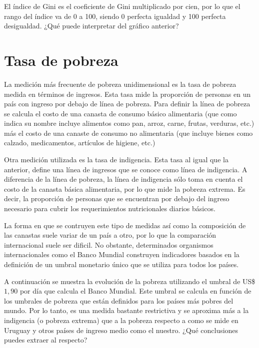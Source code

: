 \documentclass[11pt]{article}
\begin{document}
	\noindent El índice de Gini es el coeficiente de Gini multiplicado por cien, por lo que el rango del índice va de 0 a 100, siendo 0 perfecta igualdad y 100 perfecta desigualdad. ¿Qué puede interpretar del gráfico anterior? 
	
	\section{Tasa de pobreza}
	
	\noindent La medición más frecuente de pobreza unidimensional es la tasa de pobreza medida en términos de ingresos. Esta tasa mide la proporción de personas en un país con ingreso por debajo de línea de pobreza. Para definir la línea de pobreza se calcula el costo de una canasta de consumo básico alimentaria (que como indica su nombre incluye alimentos como pan, arroz, carne, frutas, verduras, etc.) más el costo de una canaste de consumo no alimentaria (que incluye bienes como calzado, medicamentos, artículos de higiene, etc.) \newline
	
	Otra medición utilizada es la tasa de indigencia. Esta tasa al igual que la anterior, define una línea de ingresos que se conoce como línea de indigencia. A diferencia de la línea de pobreza, la línea de indigencia sólo toma en cuenta el costo de la canasta básica alimentaria, por lo que mide la pobreza extrema. Es decir, la proporción de personas que se encuentran por debajo del ingreso necesario para cubrir los requerimientos nutricionales diarios básicos. \newline
	
	La forma en que se contruyen este tipo de medidas así como la composición de las canastas suele variar de un país a otro, por lo que la comparación internacional suele ser dificil. No obstante, determinados organismos internacionales como el Banco Mundial construyen indicadores basados en la definición de un umbral monetario único que se utiliza para todos los países.\newline
	
	A continuación se muestra la evolución de la pobreza utilizando el umbral de US\$ $1,90$ por día que calcula el Banco Mundial. Este umbral se calcula en función de los umbrales de pobreza que están definidos para los países más pobres del mundo. Por lo tanto, es una medida bastante restrictiva y se aproxima más a la indigencia (o pobreza extrema) que a la pobreza respecto a como se mide en Uruguay y otros países de ingreso medio como el nuestro. ¿Qué conclusiones puedes extraer al respecto?
	
\end{document}
